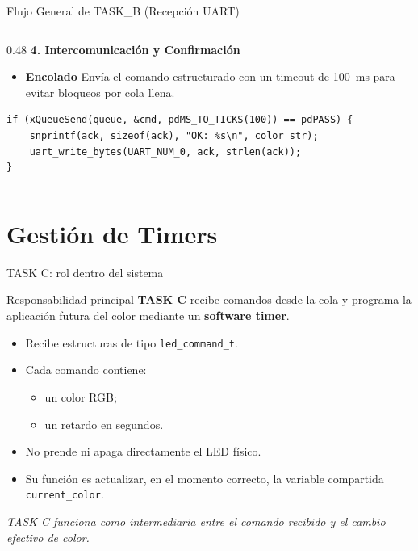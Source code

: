 \documentclass[10pt, aspectratio=169]{beamer} %
\begin{document}
\begin{frame}[fragile]{Flujo General de TASK\_B (Recepción UART)}
\begin{columns}[T]
\begin{column}{0.48\textwidth}
            \vspace{0.2cm}
            \textbf{4. Intercomunicación y Confirmación}
            \begin{itemize}
                \item \textbf{Encolado} Envía el comando estructurado con un timeout de 100~ms para evitar bloqueos por cola llena.
            \end{itemize}
            \begin{lstlisting}[basicstyle=\ttfamily\tiny]
if (xQueueSend(queue, &cmd, pdMS_TO_TICKS(100)) == pdPASS) {
    snprintf(ack, sizeof(ack), "OK: %s\n", color_str);
    uart_write_bytes(UART_NUM_0, ack, strlen(ack));
}
            \end{lstlisting}
        \end{column}

    \end{columns}
    
    \vfill
\end{frame}

\section{Gestión de Timers}

\begin{frame}{TASK C: rol dentro del sistema}
    \begin{block}{Responsabilidad principal}
        \textbf{TASK C} recibe comandos desde la cola y programa la aplicación futura del color mediante un \textbf{software timer}.
    \end{block}

    \begin{itemize}
        \item Recibe estructuras de tipo \texttt{led\_command\_t}.
        \item Cada comando contiene:
        \begin{itemize}
            \item un color RGB;
            \item un retardo en segundos.
        \end{itemize}
        \item No prende ni apaga directamente el LED físico.
        \item Su función es actualizar, en el momento correcto, la variable compartida \texttt{current\_color}.
    \end{itemize}

    \vfill
    \centering
    \textit{TASK C funciona como intermediaria entre el comando recibido y el cambio efectivo de color.}
\end{frame}
\end{document}

